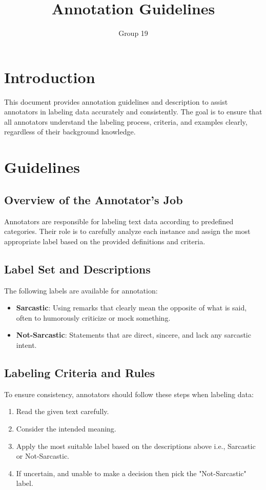 \documentclass[12pt]{article}
\title{Annotation Guidelines}
\author{Group 19}
\date{}
\begin{document}
\maketitle

\section{Introduction}
This document provides annotation guidelines and description to assist annotators in labeling data accurately and consistently. The goal is to ensure that all annotators understand the labeling process, criteria, and examples clearly, regardless of their background knowledge.

\section{Guidelines}

\subsection{Overview of the Annotator's Job}
Annotators are responsible for labeling text data according to predefined categories. Their role is to carefully analyze each instance and assign the most appropriate label based on the provided definitions and criteria.

\subsection{Label Set and Descriptions}
The following labels are available for annotation:

\begin{itemize}
    \item \textbf{Sarcastic}: Using remarks that clearly mean the opposite of what is said, often to humorously criticize or mock something.
    \item \textbf{Not-Sarcastic}: Statements that are direct, sincere, and lack any sarcastic intent.
\end{itemize}

\subsection{Labeling Criteria and Rules}
To ensure consistency, annotators should follow these steps when labeling data:

\begin{enumerate}
    \item Read the given text carefully.
    \item Consider the intended meaning.
    \item Apply the most suitable label based on the descriptions above i.e., Sarcastic or Not-Sarcastic. 
    \item If uncertain, and unable to make a decision then pick the "Not-Sarcastic" label.
\end{enumerate}
\end{document}
